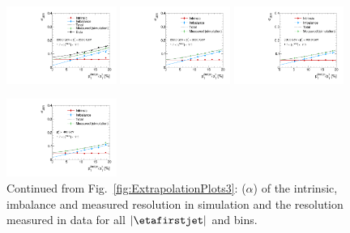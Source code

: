 \begin{figure}[!t]
 \centering
    \includegraphics[width=0.32\textwidth]{figures/resolution/results/JER_for_4_eta_bin_9_pTGamma_bin_all_contributions_PFCHS_RMS99_mc.pdf}
    \includegraphics[width=0.32\textwidth]{figures/resolution/results/JER_for_4_eta_bin_10_pTGamma_bin_all_contributions_PFCHS_RMS99_mc.pdf}
    \includegraphics[width=0.32\textwidth]{figures/resolution/results/JER_for_4_eta_bin_11_pTGamma_bin_all_contributions_PFCHS_RMS99_mc.pdf}

    \includegraphics[width=0.32\textwidth]{figures/resolution/results/JER_for_4_eta_bin_12_pTGamma_bin_all_contributions_PFCHS_RMS99_mc.pdf}
  \caption{Continued from Fig.~\ref{fig:ExtrapolationPlots3}: \jer($\alpha$) of the intrinsic, imbalance and measured resolution in simulation and the resolution measured in data for all $|\etafirstjet|$ and \ptgamma bins.}
  \label{fig:ExtrapolationPlots4}
\end{figure}
